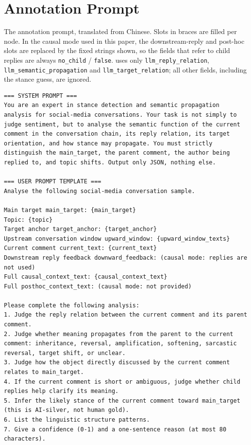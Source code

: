 \section{Annotation Prompt}
\label{app:prompt}

The annotation prompt, translated from Chinese. Slots in braces are filled per node. In the causal mode used in this paper, the downstream-reply and post-hoc slots are replaced by the fixed strings shown, so the fields that refer to child replies are always \texttt{no\_child} / \texttt{false}. \spin{} uses only \texttt{llm\_reply\_relation}, \texttt{llm\_semantic\_propagation} and \texttt{llm\_target\_relation}; all other fields, including the stance guess, are ignored.

\begin{lstlisting}[style=prompt]
=== SYSTEM PROMPT ===
You are an expert in stance detection and semantic propagation analysis for social-media conversations. Your task is not simply to judge sentiment, but to analyse the semantic function of the current comment in the conversation chain, its reply relation, its target orientation, and how stance may propagate. You must strictly distinguish the main_target, the parent comment, the author being replied to, and topic shifts. Output only JSON, nothing else.

=== USER PROMPT TEMPLATE ===
Analyse the following social-media conversation sample.

Main target main_target: {main_target}
Topic: {topic}
Target anchor target_anchor: {target_anchor}
Upstream conversation window upward_window: {upward_window_texts}
Current comment current_text: {current_text}
Downstream reply feedback downward_feedback: (causal mode: replies are not used)
Full causal_context_text: {causal_context_text}
Full posthoc_context_text: (causal mode: not provided)

Please complete the following analysis:
1. Judge the reply relation between the current comment and its parent comment.
2. Judge whether meaning propagates from the parent to the current comment: inheritance, reversal, amplification, softening, sarcastic reversal, target shift, or unclear.
3. Judge how the object directly discussed by the current comment relates to main_target.
4. If the current comment is short or ambiguous, judge whether child replies help clarify its meaning.
5. Infer the likely stance of the current comment toward main_target (this is AI-silver, not human gold).
6. List the linguistic structure patterns.
7. Give a confidence (0-1) and a one-sentence reason (at most 80 characters).


\end{lstlisting}

